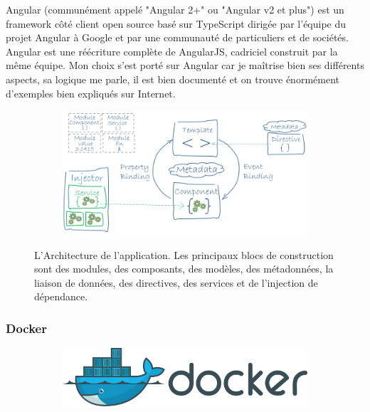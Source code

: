 \documentclass{article}
\begin{document}
Angular (communément appelé "Angular 2+" ou "Angular v2 et plus") est un framework côté client open source basé sur TypeScript dirigée par l'équipe du projet Angular à Google et par une communauté de particuliers et de sociétés. Angular est une réécriture complète de AngularJS, cadriciel construit par la même équipe.
Mon choix s'est porté sur Angular car je maîtrise bien ses différents aspects, sa logique me parle, il est bien documenté et on trouve énormément d'exemples bien expliqués sur Internet.
\begin{figure}[h!]
	\centering
	\begin{subfigure}[b]{0.9\linewidth}
  \includegraphics[width=\linewidth]{Angularf.png}
	\end{subfigure}
	\caption{L'Architecture de l'application. Les principaux blocs de construction sont des modules, des composants, des modèles, des métadonnées, la liaison de données, des directives, des services et de l'injection de dépendance.}
\end{figure}
\newpage
\subsubsection{Docker}

\begin{figure}[h!]
	\centering
  	\begin{subfigure}[b]{1.0\linewidth}
	\includegraphics[width=\linewidth]{docker.png}
  	\end{subfigure}
\end{figure}
\end{document}
